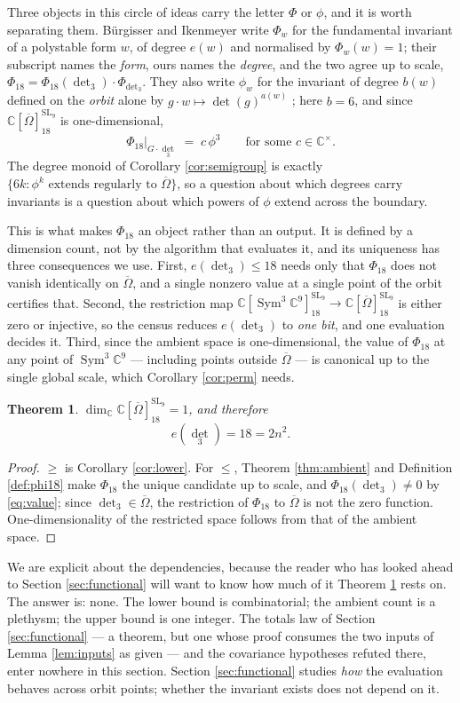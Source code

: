 \documentclass[11pt,reqno]{amsart}
\theoremstyle{plain}
\newtheorem{theorem}{Theorem}[section]
\theoremstyle{definition}
\DeclareMathOperator{\SL}{SL}
\DeclareMathOperator{\Sym}{Sym}
\newcommand{\cO}{\overline{\Omega}}
\newcommand{\bC}{\mathbb{C}}
\begin{document}
Three objects in this circle of ideas carry the letter $\Phi$ or $\phi$, and it
is worth separating them.  B\"urgisser and Ikenmeyer write $\Phi_w$ for the
fundamental invariant of a polystable form $w$, of degree $e(w)$ and normalised
by $\Phi_w(w)=1$; their subscript names the \emph{form}, ours names the
\emph{degree}, and the two agree up to scale,
$\Phi_{18}=\Phi_{18}(\det_3)\cdot\Phi_{\det_3}$.  They also write $\phi_w$ for
the invariant of degree $b(w)$ defined on the \emph{orbit} alone by
$g\cdot w\mapsto\det(g)^{a(w)}$ \cite[Lem.~3.2]{BI}; here $b=6$, and since
$\bC[\cO]^{\SL_9}_{18}$ is one-dimensional,
\[
  \Phi_{18}\big|_{G\cdot\det_3}\;=\;c\,\phi^{3}
  \qquad\text{for some }c\in\bC^{\times}.
\]
The degree monoid of Corollary \ref{cor:semigroup} is exactly
$\{6k:\phi^{k}\text{ extends regularly to }\cO\}$, so a question about which
degrees carry invariants is a question about which powers of $\phi$ extend
across the boundary.

This is what makes $\Phi_{18}$ an object rather than an output.  It is defined
by a dimension count, not by the algorithm that evaluates it, and its
uniqueness has three consequences we use.  First, $e(\det_3)\le18$ needs only
that $\Phi_{18}$ does not vanish identically on $\cO$, and a single nonzero
value at a single point of the orbit certifies that.  Second, the restriction
map $\bC[\Sym^{3}\bC^{9}]^{\SL_9}_{18}\to\bC[\cO]^{\SL_9}_{18}$ is either zero
or injective, so the census reduces $e(\det_3)$ to \emph{one bit}, and one
evaluation decides it.  Third, since the ambient space is one-dimensional, the
value of $\Phi_{18}$ at any point of $\Sym^{3}\bC^{9}$ --- including points
outside $\cO$ --- is canonical up to the single global scale, which
Corollary \ref{cor:perm} needs.

\begin{theorem}\label{thm:census}
$\dim_\bC\bC[\cO]^{\SL_9}_{18}=1$, and therefore
\[
  e(\det_3)=18=2n^{2}.
\]
\end{theorem}

\begin{proof}
$\ge$ is Corollary \ref{cor:lower}.  For $\le$, Theorem \ref{thm:ambient} and
Definition \ref{def:phi18} make $\Phi_{18}$ the unique candidate up to scale,
and $\Phi_{18}(\det_3)\neq0$ by \eqref{eq:value}; since $\det_3\in\cO$, the
restriction of $\Phi_{18}$ to $\cO$ is not the zero function.  One-dimensionality
of the restricted space follows from that of the ambient space.
\end{proof}

We are explicit about the dependencies, because the reader who has looked ahead
to Section \ref{sec:functional} will want to know how much of it Theorem
\ref{thm:census} rests on.  The answer is: none.  The lower bound is
combinatorial; the ambient count is a plethysm; the upper bound is one integer.
The totals law of Section \ref{sec:functional} --- a theorem, but one whose
proof consumes the two inputs of Lemma \ref{lem:inputs} as given --- and the
covariance hypotheses refuted there, enter nowhere in this section.
Section \ref{sec:functional} studies \emph{how} the evaluation behaves across
orbit points; whether the invariant exists does not depend on it.
\end{document}
